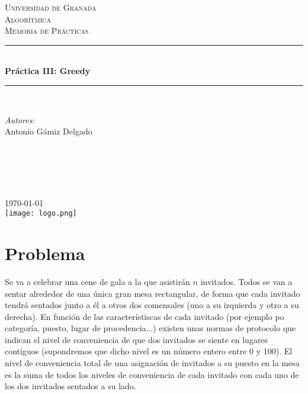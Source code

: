 \documentclass[11pt]{article}
\begin{document}
\begin{titlepage}
\newcommand{\HRule}{\rule{\linewidth}{0.5mm}}
\center
\textsc{\LARGE Universidad de Granada}\\[1.5cm] %
\textsc{\Large Algorítmica}\\[0.5cm] %
\textsc{\large Memoria de Prácticas}\\[0.5cm] %
\HRule \\[0.4cm]
{ \huge \bfseries Práctica III: Greedy}\\[0.4cm] %
\HRule \\[1.5cm]
\begin{minipage}{0.4\textwidth}
\begin{flushleft} \large
\emph{Autores:}\\
Antonio Gámiz Delgado\textsc{} %
\end{flushleft}
\end{minipage}
~
\begin{minipage}{0.4\textwidth}
\begin{flushright} \large
\emph{} \\
\textsc{} %
\end{flushright}
\end{minipage}\\[2cm]
{\large \today}\\[2cm] %
\texttt{[image: logo.png]}\\[1cm]
\vfill %
\end{titlepage}

\section{Problema}

Se va a celebrar una cene de gala a la que asistirán $n$ invitados. Todos se van a sentar alrededor de una única gran mesa rectangular, de forma que cada invitado tendrá sentados junto a él a otros dos comensales (uno a su izquierda y otro a su derecha). En función de las característiscas de cada invitado (por ejemplo po categoría, puesto, lugar de procedencia...) existen unas normas de protocolo que indican el nivel de conveniencia de que dos invitados se siente en lugares contiguos (supondremos que dicho nivel es un número entero entre 0 y 100). El nivel de conveniencia total de una asignación de invitados a su puesto en la mesa es la suma de todos los niveles de conveniencia de cada invitado con cada uno de los dos invitados sentados a su lado.
\end{document}
